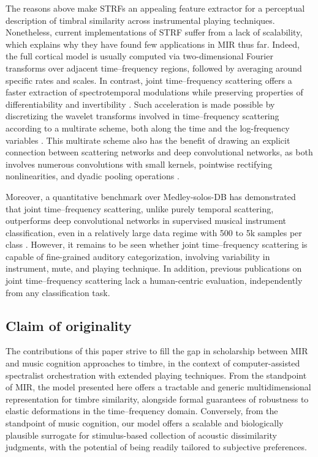 \documentclass{bmcart}
\begin{document}
The reasons above make STRFs an appealing feature extractor for a perceptual description of timbral similarity across instrumental playing techniques.
Nonetheless, current implementations of STRF suffer from a lack of scalability, which explains why they have found few applications in MIR thus far.
Indeed, the full cortical model is usually computed via two-dimensional Fourier transforms over adjacent time--frequency regions, followed by averaging around specific rates and scales.
In contrast, joint time--frequency scattering offers a faster extraction of spectrotemporal modulations while preserving properties of differentiability \cite{andreux2020jmlr} and invertibility \cite{lostanlen2019dafx}.
Such acceleration is made possible by discretizing the wavelet transforms involved in time--frequency scattering according to a multirate scheme, both along the time and the log-frequency variables \cite{anden2019tsp}.
This multirate scheme also has the benefit of drawing an explicit connection between scattering networks and deep convolutional networks, as both involves numerous convolutions with small kernels, pointwise rectifying nonlinearities, and dyadic pooling operations \cite{mallat2016philtrans}.

Moreover, a quantitative benchmark over Medley-solos-DB has demonstrated that joint time--frequency scattering, unlike purely temporal scattering, outperforms deep convolutional networks in supervised musical instrument classification, even in a relatively large data regime with 500 to 5k samples per class \cite{anden2019tsp}.
However, it remains to be seen whether joint time--frequency scattering is capable of fine-grained auditory categorization, involving variability in instrument, mute, and playing technique.
In addition, previous publications on joint time--frequency scattering lack a human-centric evaluation, independently from any classification task.

\subsection*{Claim of originality}
The contributions of this paper strive to fill the gap in scholarship between MIR and music cognition approaches to timbre, in the context of computer-assisted spectralist orchestration with extended playing techniques.
From the standpoint of MIR, the model presented here offers a tractable and generic multidimensional representation for timbre similarity, alongside formal guarantees of robustness to elastic deformations in the time--frequency domain.
Conversely, from the standpoint of music cognition, our model offers a scalable and biologically plausible surrogate for stimulus-based collection of acoustic dissimilarity judgments, with the potential of being readily tailored to subjective preferences.
\end{document}
